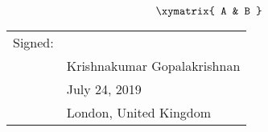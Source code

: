\begin{equation*}
  \xymatrix{
    A & B
  }
\end{equation*}

\begin{flushright}
  \begin{tabular}{@{}p{.4in}p{2.1in}@{}}
    Signed: & \hrulefill \\
            & Krishnakumar Gopalakrishnan \\
            & July 24, 2019\\
            & London, United Kingdom \\
  \end{tabular}
\end{flushright}
